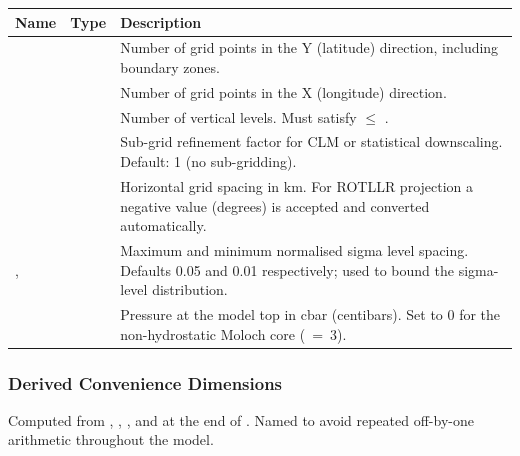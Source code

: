 \begin{longtable}{L{3cm} L{3cm} L{8cm}}
  \toprule
  \textbf{Name} & \textbf{Type} & \textbf{Description} \\
  \midrule
  \endhead
  \bottomrule
  \endfoot
    &  &
    Number of grid points in the Y (latitude) direction, including boundary
    zones. \\
    &  &
    Number of grid points in the X (longitude) direction. \\
    &  &
    Number of vertical levels. Must satisfy  $\leq$ . \\
   &  &
    Sub-grid refinement factor for CLM or statistical downscaling.
    Default: 1 (no sub-gridding). \\
    &  &
    Horizontal grid spacing in km. For ROTLLR projection a negative value
    (degrees) is accepted and converted automatically. \\
  ,  &  &
    Maximum and minimum normalised sigma level spacing. Defaults
    0.05 and 0.01 respectively; used to bound the sigma-level
    distribution. \\
   &  &
    Pressure at the model top in cbar (centibars). Set to 0 for the
    non-hydrostatic Moloch core (~=~3). \\
\end{longtable}

\subsubsection{Derived Convenience Dimensions}

Computed from , , , and  at the end
of . Named to avoid repeated off-by-one arithmetic
throughout the model.


